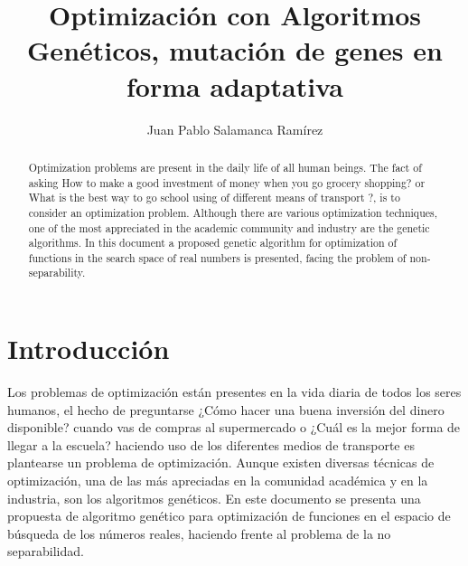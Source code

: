 \documentclass{llncs}
\begin{document}
\title{Optimización con Algoritmos Genéticos, mutación de genes en forma adaptativa}
%
%
\author{Juan Pablo Salamanca Ramírez}
%
%
\tocauthor{}
%

\maketitle

\begin{abstract}
Optimization problems are present in the daily life of all human beings. The fact of asking How to make a good investment of money when you go grocery shopping? or What is the best way to go school using of different means of transport ?, is to consider an optimization problem.
Although there are various optimization techniques, one of the most appreciated in the academic community and industry are the genetic algorithms. In this document a proposed genetic algorithm for optimization of functions in the search space of real numbers is presented, facing the problem of non-separability.
\end{abstract}
%

\section{Introducción}
Los problemas de optimización están presentes en la vida diaria de todos los seres humanos, el hecho de preguntarse ¿Cómo hacer una buena inversión del dinero disponible? cuando vas de compras al supermercado o ¿Cuál es la mejor forma de llegar a la escuela? haciendo uso de los diferentes medios de transporte es plantearse un problema de optimización. Aunque existen diversas técnicas de optimización, una de las más apreciadas en la comunidad académica y en la industria, son los algoritmos genéticos. En este documento se presenta una propuesta de algoritmo genético para optimización de funciones en el espacio de búsqueda de los números reales, haciendo frente al problema de la no separabilidad.
\end{document}
